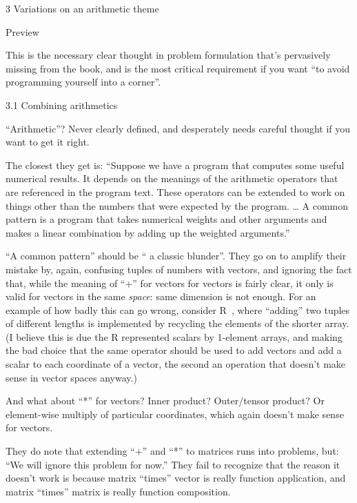 \documentclass[12pt]{PalisadesLakesBook}
\begin{document}
\begin{plSection}{3 Variations on an arithmetic theme}
\begin{plSection}{Preview}
\begin{itemize}
\end{itemize}

This is the necessary clear thought  in problem formulation
that's pervasively missing from the book,
and is the most critical requirement if you want
``to avoid programming yourself into a corner''.

\end{plSection}%
\begin{plSection}{3.1 Combining arithmetics}

``Arithmetic''? Never clearly defined, and desperately needs 
careful thought if you want to get it right.

The closest they get is:
``Suppose we have a program that computes some useful numerical 
results.
It depends on the meanings of the arithmetic operators 
that are referenced in the program text.
These operators can be extended to work on things
other than the numbers that were expected by the program.
{\ldots}
A common pattern is a program that takes numerical weights and 
other arguments and makes a linear combination by adding up
the weighted arguments.''

``A common pattern'' should be `` a classic blunder''.
They go on to amplify their mistake by, again, confusing
tuples of numbers with vectors, and ignoring the fact that,
while the meaning of ``+'' for vectors for vectors is fairly
clear, it only is valid for vectors in the same \emph{space}:
same dimension is not enough. 
For an example of how badly this can go wrong, 
consider R~\cite{GentlemanEtal:2011:R},
where ``adding'' two tuples of different lengths is implemented
by recycling the elements of the shorter array.
(I believe this is due the R represented scalars by 1-element
arrays, and making the bad choice that the same operator
should be used to add vectors and add a scalar to each coordinate
of a vector, the second an operation that doesn't make sense
in vector spaces anyway.)

And what about ``*'' for vectors? 
Inner product? Outer/tensor product?
Or element-wise multiply of particular coordinates, 
which again doesn't make sense for vectors.

They do note that extending ``+'' and ``*'' to matrices
runs into problems, but: ``We will ignore this problem for now.''
They fail to recognize that the reason it doesn't work is
because matrix ``times'' vector is really function application,
and matrix ``times'' matrix is really function composition.


\end{plSection}
\end{plSection}
\end{document}
